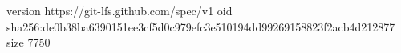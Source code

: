 version https://git-lfs.github.com/spec/v1
oid sha256:de0b38ba6390151ee3cf5d0c979efc3e510194dd99269158823f2acb4d212877
size 7750
